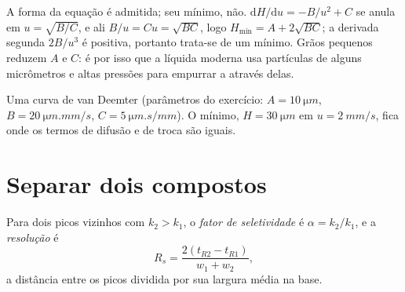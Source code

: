 \admitted

A forma da equação é admitida; seu mínimo, não. $\mathrm dH/\mathrm du = -B/u^2 + C$ se anula
em $u = \sqrt{B/C}$, e ali $B/u = Cu = \sqrt{BC}$, logo $H_{\min} = A + 2\sqrt{BC}$; a derivada
segunda $2B/u^3$ é positiva, portanto trata-se de um mínimo. Grãos pequenos reduzem $A$ e $C$: é por
isso que a  líquida moderna usa partículas de alguns micrômetros e altas pressões para
empurrar a  através delas.

\begin{omfigure}

{\small Uma curva de van Deemter (parâmetros do exercício: $A = \qty{10}{\micro m}$, $B = \qty{20}{\micro m.mm/s}$,
$C = \qty{5}{\micro m.s/mm}$). O mínimo, $H = \qty{30}{\micro m}$ em $u = \qty{2}{mm/s}$, fica onde
os termos de difusão e de troca são iguais.}
\end{omfigure}

\section{Separar dois compostos}

\begin{definition}\label{def:b2:chromatography:separation}
Para dois picos vizinhos com $k_2 > k_1$, o \emph{fator de seletividade} é
$\alpha = k_2/k_1$, e a \emph{resolução} é
\begin{equation*}
R_s = \frac{2(t_{R2} - t_{R1})}{w_1 + w_2},
\end{equation*}
a distância entre os picos dividida por sua largura média na base.
\end{definition}


